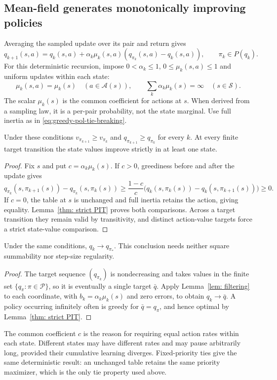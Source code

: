 \subsection{Mean-field generates monotonically improving policies}
\label{sec: mean field}
Averaging the sampled update over its pair and return gives
\begin{equation}\label{eq: deterministic mcopi}
q_{k+1}(s,a)=q_k(s,a)+\alpha_k\mu_k(s,a)(q_{\pi_k}(s,a)-q_k(s,a)),\qquad\pi_k\in P(q_k).
\end{equation}
For this deterministic recursion, impose $0<\alpha_k\le1$, $0\le\mu_k(s,a)\le1$ and uniform updates within each state:
\begin{equation}\label{eq: mean field learning}
\mu_k(s,a)=\mu_k(s)\quad(a\in\mathcal A(s)),\qquad
\sum_k\alpha_k\mu_k(s)=\infty\quad(s\in\mathcal S).
\end{equation}
The scalar $\mu_k(s)$ is the common coefficient for actions at $s$. When derived from a sampling law, it is a per-pair probability, not the state marginal. Use full inertia as in \eqref{eq:greedy-pol-tie-breaking}.

\begin{proposition}\label{thm: improving policies}
Under these conditions $v_{\pi_{k+1}}\ge v_{\pi_k}$ and $q_{\pi_{k+1}}\ge q_{\pi_k}$ for every $k$. At every finite target transition the state values improve strictly in at least one state.
\end{proposition}
\begin{proof}
Fix $s$ and put $c=\alpha_k\mu_k(s)$. If $c>0$, greediness before and after the update gives
\[
q_{\pi_k}(s,\pi_{k+1}(s))-q_{\pi_k}(s,\pi_k(s))
\ge\frac{1-c}{c}\bigl(q_k(s,\pi_k(s))-q_k(s,\pi_{k+1}(s))\bigr)\ge0.
\]
If $c=0$, the table at $s$ is unchanged and full inertia retains the action, giving equality. Lemma~\ref{thm: strict PIT} proves both comparisons. Across a target transition they remain valid by transitivity, and distinct action-value targets force a strict state-value comparison.
\end{proof}

\begin{proposition}\label{thm: convergence deterministic mcopi}
Under the same conditions, $q_k\to q_{\pi_*}$. This conclusion needs neither square summability nor step-size regularity.
\end{proposition}
\begin{proof}
The target sequence $(q_{\pi_k})$ is nondecreasing and takes values in the finite set $\{q_\pi:\pi\in\mathcal P\}$, so it is eventually a single target $\bar q$. Apply Lemma~\ref{lem: filtering} to each coordinate, with $b_k=\alpha_k\mu_k(s)$ and zero errors, to obtain $q_k\to\bar q$. A policy occurring infinitely often is greedy for $\bar q=q_\pi$, and hence optimal by Lemma~\ref{thm: strict PIT}.
\end{proof}

The common coefficient $c$ is the reason for requiring equal action rates within each state. Different states may have different rates and may pause arbitrarily long, provided their cumulative learning diverges. Fixed-priority ties give the same deterministic result: an unchanged table retains the same priority maximizer, which is the only tie property used above.
